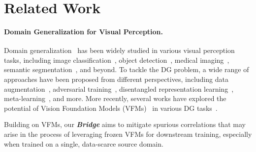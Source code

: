 \section{Related Work}
\label{sec:related-works}

\paragraph{Domain Generalization for Visual Perception.}
Domain generalization~\cite{blanchard2011generalizing} has been widely studied in various visual perception tasks, 
including image classification~\cite{li2017deeper,li2019feature}, object detection~\cite{malisiewicz2011ensemble,hoffman2016learning}, medical imaging~\cite{liu2020ms,liu2020shape}, semantic segmentation~\cite{yue2019domain,volpi2019addressing}, and beyond. 
To tackle the DG problem, a wide range of approaches have been proposed from different perspectives, 
including data augmentation~\cite{volpi2019addressing, shi2020towards}, adversarial training~\cite{li2018deep,rahman2020correlation,albuquerque2019generalizing}, disentangled representation learning~\cite{li2017deeper,khosla2012undoing}, meta-learning~\cite{li2018learning,balaji2018metareg}, and more.
More recently, several works have explored the potential of Vision Foundation Models (VFMs)~\cite{caron2021emerging,kirillov2023segany} 
in various DG tasks~\cite{he2025generalized,wei2024stronger,yun2025soma}.


Building on VFMs, our \textbf{\textit{Bridge }} aims to mitigate spurious correlations that may arise in the process of leveraging frozen VFMs for downstream training, 
especially when trained on a single, data-scarce source domain.
\vspace{-1mm}
